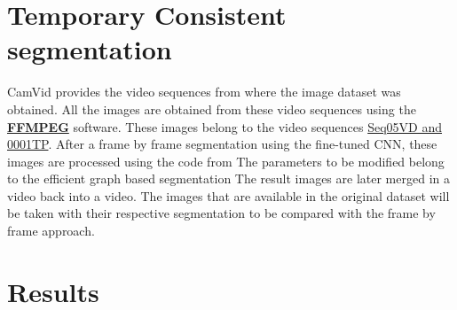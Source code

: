 \section{Temporary Consistent segmentation}
\label{temporary consistent segmentation}
CamVid provides the video sequences from where the image dataset was obtained. All the images are obtained from these video sequences using the \href{https://www.ffmpeg.org/}{\textbf{FFMPEG}} software. These images belong to the video sequences \href{http://mi.eng.cam.ac.uk/research/projects/VideoRec/CamVid/}{Seq05VD and 0001TP}. 
After a frame by frame segmentation using the fine-tuned CNN, these images are processed using the code from %
The parameters to be modified belong to the efficient graph based segmentation %
The result images are later merged in a video back into a video. The images that are available in the original dataset will be taken with their respective segmentation to be compared with the frame by frame approach.

\section{Results}
